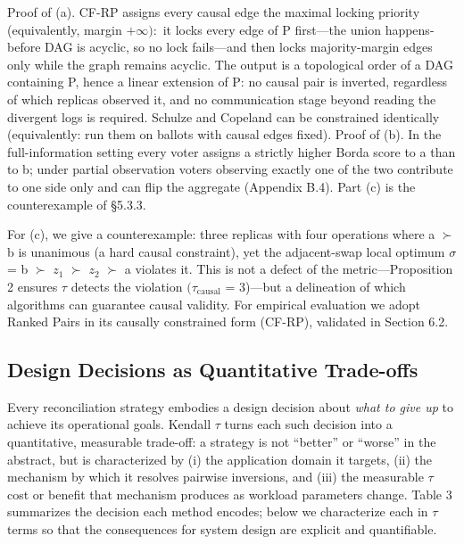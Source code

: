 \documentclass[11pt]{article}
\begin{document}
Proof of (a). CF-RP assigns every causal edge the maximal locking priority (equivalently, margin $+\infty ):$ it locks every edge of P first—the union happens-before DAG is acyclic, so no lock fails—and then locks majority-margin edges only while the graph remains acyclic. The output is a topological order of a DAG containing P, hence a linear extension of P: no causal pair is inverted, regardless of which replicas observed it, and no communication stage beyond reading the divergent logs is required. Schulze and Copeland can be constrained identically (equivalently: run them on ballots with causal edges fixed). Proof of (b). In the full-information setting every voter assigns a strictly higher Borda score to a than to b; under partial observation voters observing exactly one of the two contribute to one side only and can flip the aggregate (Appendix B.4). Part (c) is the counterexample of §5.3.3.

For (c), we give a counterexample: three replicas with four operations where a $\succ $ b is unanimous (a hard causal constraint), yet the adjacent-swap local optimum $\sigma $ = b $\succ $ $z_{1}$ $\succ $ $z_{2}$ $\succ $ a violates it. This is not a defect of the metric—Proposition 2 ensures $\tau $ detects the violation $(\tau _{\mathrm{causal}}$ = 3)—but a delineation of which algorithms can guarantee causal validity. For empirical evaluation we adopt Ranked Pairs in its causally constrained form (CF-RP), validated in Section 6.2.

\subsection{Design Decisions as Quantitative Trade-offs}
Every reconciliation strategy embodies a design decision about \emph{what to give up} to achieve its operational goals. Kendall $\tau $ turns each such decision into a quantitative, measurable trade-off: a strategy is not “better” or “worse” in the abstract, but is characterized by (i) the application domain it targets, (ii) the mechanism by which it resolves pairwise inversions, and (iii) the measurable $\tau $ cost or benefit that mechanism produces as workload parameters change. Table 3 summarizes the decision each method encodes; below we characterize each in $\tau $ terms so that the consequences for system design are explicit and quantifiable.
\end{document}
